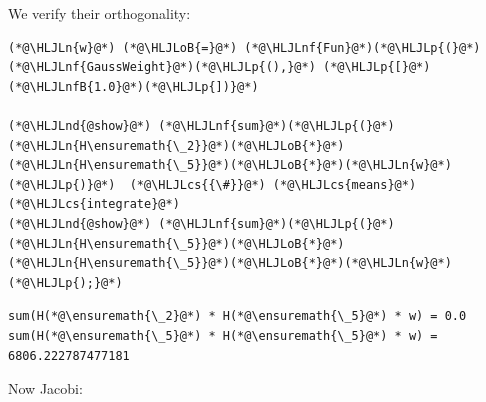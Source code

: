 \documentclass[12pt,a4paper]{article}
\newcommand{\HLJLn}[1]{#1}
\newcommand{\HLJLnd}[1]{\textcolor[RGB]{214,102,97}{#1}}
\newcommand{\HLJLnf}[1]{\textcolor[RGB]{66,102,213}{#1}}
\newcommand{\HLJLnfB}[1]{\textcolor[RGB]{59,151,46}{#1}}
\newcommand{\HLJLoB}[1]{\textcolor[RGB]{102,102,102}{\textbf{#1}}}
\newcommand{\HLJLp}[1]{#1}
\newcommand{\HLJLcs}[1]{\textcolor[RGB]{153,153,119}{\textit{#1}}}
\begin{document}
We verify their orthogonality:


\begin{lstlisting}
(*@\HLJLn{w}@*) (*@\HLJLoB{=}@*) (*@\HLJLnf{Fun}@*)(*@\HLJLp{(}@*)(*@\HLJLnf{GaussWeight}@*)(*@\HLJLp{(),}@*) (*@\HLJLp{[}@*)(*@\HLJLnfB{1.0}@*)(*@\HLJLp{])}@*)

(*@\HLJLnd{@show}@*) (*@\HLJLnf{sum}@*)(*@\HLJLp{(}@*)(*@\HLJLn{H\ensuremath{\_2}}@*)(*@\HLJLoB{*}@*)(*@\HLJLn{H\ensuremath{\_5}}@*)(*@\HLJLoB{*}@*)(*@\HLJLn{w}@*)(*@\HLJLp{)}@*)  (*@\HLJLcs{{\#}}@*) (*@\HLJLcs{means}@*) (*@\HLJLcs{integrate}@*)
(*@\HLJLnd{@show}@*) (*@\HLJLnf{sum}@*)(*@\HLJLp{(}@*)(*@\HLJLn{H\ensuremath{\_5}}@*)(*@\HLJLoB{*}@*)(*@\HLJLn{H\ensuremath{\_5}}@*)(*@\HLJLoB{*}@*)(*@\HLJLn{w}@*)(*@\HLJLp{);}@*)
\end{lstlisting}

\begin{lstlisting}
sum(H(*@\ensuremath{\_2}@*) * H(*@\ensuremath{\_5}@*) * w) = 0.0
sum(H(*@\ensuremath{\_5}@*) * H(*@\ensuremath{\_5}@*) * w) = 6806.222787477181
\end{lstlisting}


Now Jacobi:
\end{document}
